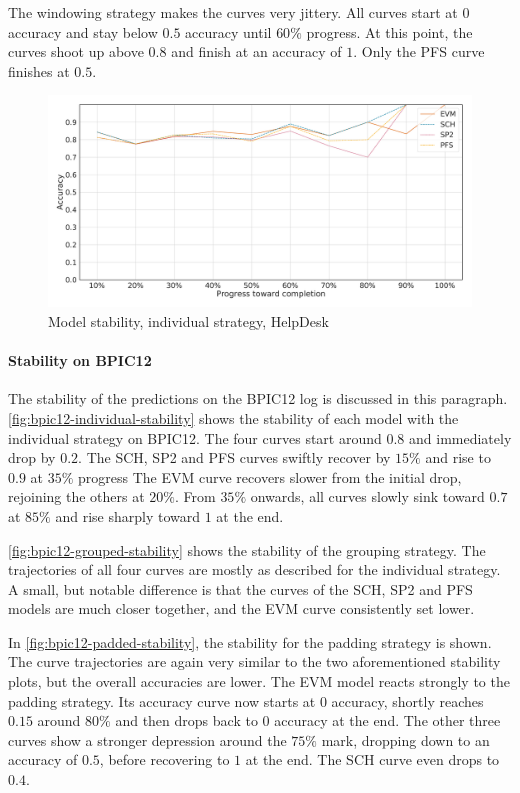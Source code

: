 The windowing strategy makes the curves very jittery.
All curves start at 0 accuracy and stay below $0.5$ accuracy until $60\%$ progress.
At this point, the curves shoot up above $0.8$ and finish at an accuracy of $1$.
Only the PFS curve finishes at $0.5$.

\begin{figure}[!htb]
    \centering
    \includegraphics[width=\textwidth]{gfx/helpdesk/individual_stability.pdf}
    \caption{Model stability, individual strategy, HelpDesk}
    \label{fig:helpdesk-individual-stability}
\end{figure}
\FloatBarrier

\paragraph{Stability on BPIC12}
The stability of the predictions on the BPIC12 log is discussed in this paragraph.
\autoref{fig:bpic12-individual-stability} shows the stability of each model with the individual strategy on BPIC12.
The four curves start around $0.8$ and immediately drop by $0.2$.
The SCH, SP2 and PFS curves swiftly recover by $15\%$ and rise to $0.9$ at $35\%$ progress
The EVM curve recovers slower from the initial drop, rejoining the others at $20\%$.
From $35\%$ onwards, all curves slowly sink toward $0.7$ at $85\%$ and rise sharply toward $1$ at the end.

\autoref{fig:bpic12-grouped-stability} shows the stability of the grouping strategy.
The trajectories of all four curves are mostly as described for the individual strategy.
A small, but notable difference is that the curves of the SCH, SP2 and PFS models are much closer together, and the EVM curve consistently set lower.

In \autoref{fig:bpic12-padded-stability}, the stability for the padding strategy is shown.
The curve trajectories are again very similar to the two aforementioned stability plots, but the overall accuracies are lower.
The EVM model reacts strongly to the padding strategy.
Its accuracy curve now starts at $0$ accuracy, shortly reaches $0.15$ around $80\%$ and then drops back to $0$ accuracy at the end.
The other three curves show a stronger depression around the $75\%$ mark, dropping down to an accuracy of $0.5$, before recovering to $1$ at the end.
The SCH curve even drops to $0.4$.

